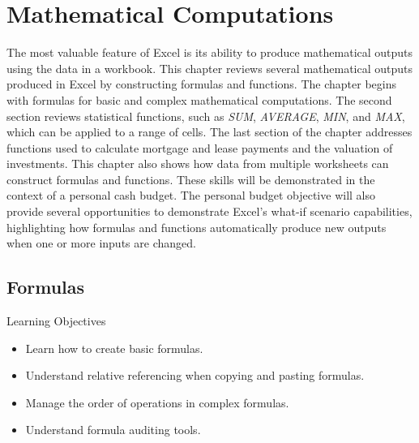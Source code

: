 \chapter{Mathematical Computations}\label{ch02:computations}

The most valuable feature of Excel is its ability to produce mathematical outputs using the data in a workbook. This chapter reviews several mathematical outputs produced in Excel by constructing formulas and functions. The chapter begins with formulas for basic and complex mathematical computations. The second section reviews statistical functions, such as \textit{SUM}, \textit{AVERAGE}, \textit{MIN}, and \textit{MAX}, which can be applied to a range of cells. The last section of the chapter addresses functions used to calculate mortgage and lease payments and the valuation of investments. This chapter also shows how data from multiple worksheets can construct formulas and functions. These skills will be demonstrated in the context of a personal cash budget. The personal budget objective will also provide several opportunities to demonstrate Excel's what-if scenario capabilities, highlighting how formulas and functions automatically produce new outputs when one or more inputs are changed.

\section{Formulas}

\begin{center}
	\begin{objbox}{Learning Objectives}
		\begin{itemize}
			\setlength{\itemsep}{0pt}
			\setlength{\parskip}{0pt}
			\setlength{\parsep}{0pt}
			
			\item Learn how to create basic formulas.
			\item Understand relative referencing when copying and pasting formulas.
			\item Manage the order of operations in complex formulas.
			\item Understand formula auditing tools.

		\end{itemize}
	\end{objbox}
\end{center}

